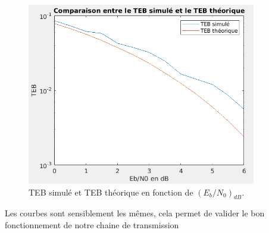 \documentclass[frenchb]{article}
\begin{document}
\begin{enumerate}
\begin{figure}[ht!]
    		\centering
		\includegraphics[width=10cm]{C1teb.png}		              	 	\caption{TEB simulé et TEB théorique en fonction de $\left(E_b/N_0\right)_{dB}$. \label{F15}}
	\end{figure}
	
	Les courbes sont sensiblement les mêmes, cela permet de valider le bon fonctionnement de notre chaine de transmission
\end{enumerate}
\end{document}

